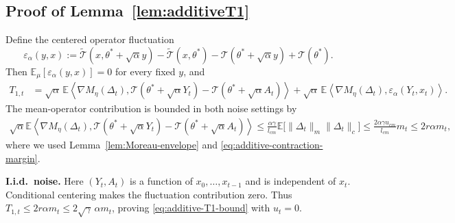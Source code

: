 \documentclass[11pt,letterpaper]{article}
\theoremstyle{plain}
\theoremstyle{definition}
\theoremstyle{remark}
\newcommand{\E}{\mathbb{E}}
\newcommand{\mT}{\mathcal{T}}
\newcommand{\tmT}{\widetilde{\mT}}
\begin{document}
\subsection{Proof of Lemma~\ref{lem:additiveT1}}
\label{sec:proof-additiveT1}
Define the centered operator fluctuation
\[
    \varepsilon_\alpha(y,x)
    :=\tmT(x,\theta^*+\sqrt\alpha y)-\tmT(x,\theta^*)
      -\mT(\theta^*+\sqrt\alpha y)+\mT(\theta^*).
\]
Then $\E_\mu[\varepsilon_\alpha(y,x)]=0$ for every fixed $y$, and
\begin{align*}
    T_{1,t}
    &=\sqrt\alpha\,
      \E\left\langle\nabla M_\eta(\Delta_t),
          \mT(\theta^*+\sqrt\alpha Y_t)
          -\mT(\theta^*+\sqrt\alpha A_t)\right\rangle+\sqrt\alpha\,
      \E\left\langle\nabla M_\eta(\Delta_t),
          \varepsilon_\alpha(Y_t,x_t)\right\rangle.
\end{align*}
The mean-operator contribution is bounded in both noise settings by
\begin{align*}
    \sqrt\alpha
      \E\left\langle\nabla M_\eta(\Delta_t),
          \mT(\theta^*+\sqrt\alpha Y_t)
          -\mT(\theta^*+\sqrt\alpha A_t)\right\rangle\leq\frac{\alpha\gamma}{l_{cm}}
        \E\bigl[\|\Delta_t\|_m\|\Delta_t\|_c\bigr]
    \leq\frac{2\alpha\gamma u_{cm}}{l_{cm}}m_t
    \leq2r\alpha m_t,
\end{align*}
where we used Lemma~\ref{lem:Moreau-envelope} and
\eqref{eq:additive-contraction-margin}.

\noindent\textbf{I.i.d.\ noise.}
Here $(Y_t,A_t)$ is a function of $x_0,\ldots,x_{t-1}$ and is independent
of $x_t$. Conditional centering makes the fluctuation contribution zero.
Thus $T_{1,t}\leq2r\alpha m_t\leq2\sqrt\gamma\,\alpha m_t$, proving
\eqref{eq:additive-T1-bound} with $u_t=0$.
\end{document}
